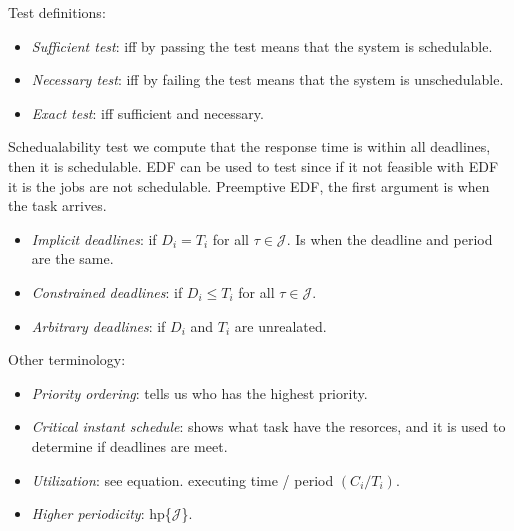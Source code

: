Test definitions:
\begin{itemize}
  \item \textit{Sufficient test}: iff by passing the test means that the system is schedulable.
  \item \textit{Necessary test}: iff by failing the test means that the system is unschedulable.
  \item \textit{Exact test}: iff sufficient and necessary.
\end{itemize}

Schedualability test we compute that the response time is within all deadlines, then it is schedulable.
EDF can be used to test since if it not feasible with EDF it is the jobs are not schedulable.
Preemptive EDF, the first argument is when the task arrives.

\begin{itemize}
  \item \textit{Implicit deadlines}: if $D_i = T_i$ for all $\tau\in\mathcal{J}$. Is when the deadline and period are the same.
  \item \textit{Constrained deadlines}: if $D_i \leq T_i$ for all $\tau\in\mathcal{J}$.
  \item \textit{Arbitrary deadlines}: if $D_i$ and $T_i$ are unrealated.
\end{itemize}
 
Other terminology:
\begin{itemize}
  \item \textit{Priority ordering}: tells us who has the highest priority.
  \item \textit{Critical instant schedule}: shows what task have the resorces, and it is used to determine if deadlines are meet.
  \item \textit{Utilization}: see equation. executing time / period $ (C_i / T_i)$.
  \item \textit{Higher periodicity}: hp\{$\mathcal{J}$\}.
\end{itemize}


